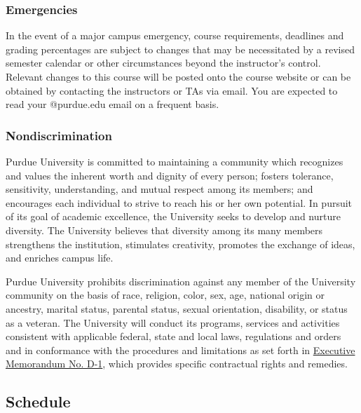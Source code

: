 \documentclass{article}
\begin{document}
\hypertarget{emergencies_27}{}\subsubsection*{{Emergencies}}\label{emergencies_27}

In the event of a major campus emergency, course requirements, deadlines and grading percentages are subject to changes that may be necessitated by a revised semester calendar or other circumstances beyond the instructor’s control. Relevant changes to this course will be posted onto the course website or can be obtained by contacting the instructors or TAs via email. You are expected to read your @purdue.edu email on a frequent basis.

\hypertarget{nondiscrimination_28}{}\subsubsection*{{Nondiscrimination}}\label{nondiscrimination_28}

Purdue University is committed to maintaining a community which recognizes and values the inherent worth and dignity of every person; fosters tolerance, sensitivity, understanding, and mutual respect among its members; and encourages each individual to strive to reach his or her own potential. In pursuit of its goal of academic excellence, the University seeks to develop and nurture diversity. The University believes that diversity among its many members strengthens the institution, stimulates creativity, promotes the exchange of ideas, and enriches campus life.

Purdue University prohibits discrimination against any member of the University community on the basis of race, religion, color, sex, age, national origin or ancestry, marital status, parental status, sexual orientation, disability, or status as a veteran. The University will conduct its programs, services and activities consistent with applicable federal, state and local laws, regulations and orders and in conformance with the procedures and limitations as set forth in \href{http://www.purdue.edu/policies/pages/human_resources/d_1.html}{Executive Memorandum No. D-1}, which provides specific contractual rights and remedies.

\hypertarget{schedule_29}{}\subsection*{{Schedule}}\label{schedule_29}
\end{document}
